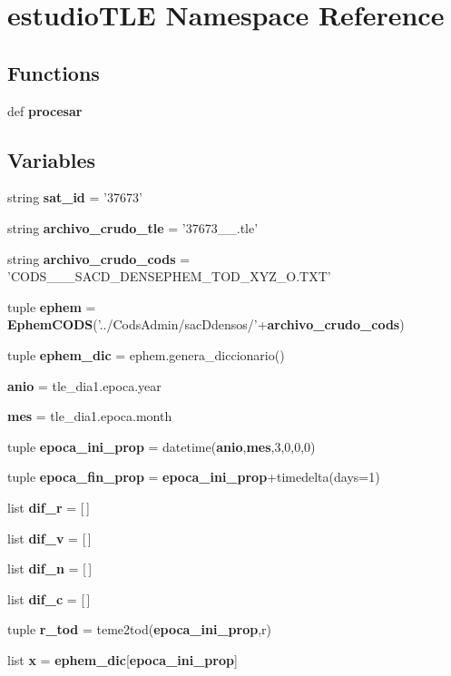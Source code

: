 \section{estudio\-T\-L\-E \-Namespace \-Reference}
\label{namespaceestudio_t_l_e}
\subsection*{\-Functions}
\begin{DoxyCompactItemize}
\item 
def {\bf procesar}
\end{DoxyCompactItemize}
\subsection*{\-Variables}
\begin{DoxyCompactItemize}
\item 
string {\bf sat\-\_\-id} = '37673'
\item 
string {\bf archivo\-\_\-crudo\-\_\-tle} = '37673\-\_\-\_.\-tle'
\item 
string {\bf archivo\-\_\-crudo\-\_\-cods} = '\-C\-O\-D\-S\-\_\-\_\-\_\-\-S\-A\-C\-D\-\_\-\-D\-E\-N\-S\-E\-P\-H\-E\-M\-\_\-\-T\-O\-D\-\_\-\-X\-Y\-Z\-\_\-\-O.\-T\-X\-T'
\item 
tuple {\bf ephem} = {\bf \-Ephem\-C\-O\-D\-S}('../\-Cods\-Admin/sac\-Ddensos/'+{\bf archivo\-\_\-crudo\-\_\-cods})
\item 
tuple {\bf ephem\-\_\-dic} = ephem.\-genera\-\_\-diccionario()
\item 
{\bf anio} = tle\-\_\-dia1.\-epoca.\-year
\item 
{\bf mes} = tle\-\_\-dia1.\-epoca.\-month
\item 
tuple {\bf epoca\-\_\-ini\-\_\-prop} = datetime({\bf anio},{\bf mes},3,0,0,0)
\item 
tuple {\bf epoca\-\_\-fin\-\_\-prop} = {\bf epoca\-\_\-ini\-\_\-prop}+timedelta(days=1)
\item 
list {\bf dif\-\_\-r} = [$\,$]
\item 
list {\bf dif\-\_\-v} = [$\,$]
\item 
list {\bf dif\-\_\-n} = [$\,$]
\item 
list {\bf dif\-\_\-c} = [$\,$]
\item 
tuple {\bf r\-\_\-tod} = teme2tod({\bf epoca\-\_\-ini\-\_\-prop},r)
\item 
list {\bf x} = {\bf ephem\-\_\-dic}[{\bf epoca\-\_\-ini\-\_\-prop}]

\end{DoxyCompactItemize}
